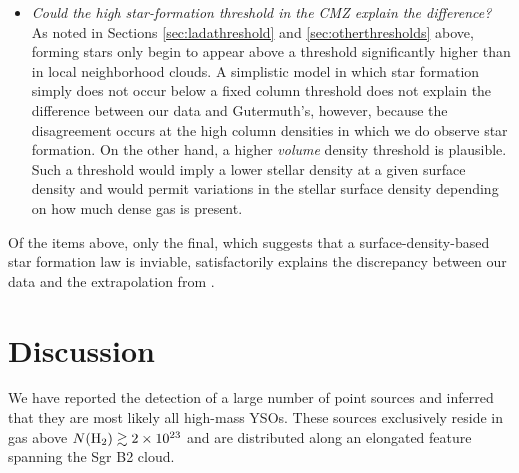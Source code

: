 \documentclass[twocolumn]{aastex61}
\begin{document}
\begin{itemize}
    \item \emph{Could the high star-formation threshold in the CMZ explain the
        difference?}
        As noted in Sections \ref{sec:ladathreshold} and
        \ref{sec:otherthresholds} above, forming stars only begin to appear
        above a threshold significantly higher than in local neighborhood
        clouds.  A simplistic model in which star formation simply does not
        occur below a fixed column threshold does not explain the difference
        between our data and Gutermuth's, however, because the disagreement
        occurs at the high column densities in which we do observe star
        formation.  On the other hand, a higher \emph{volume} density threshold
        is plausible.  Such a threshold would imply a lower stellar density at
        a given surface density and would  permit variations in the stellar
        surface density depending on how much dense gas is present.



\end{itemize}

Of the items above, only the final, which suggests that a surface-density-based
star formation law is inviable, satisfactorily explains the discrepancy between
our data and the extrapolation from \citet{Gutermuth2011a}.




\section{Discussion}
\label{sec:discussion}
We have reported the detection of a large number of point sources and inferred
that they are most likely all high-mass YSOs.  These sources exclusively
reside in gas above $N(\textrm{H}_{2})\gtrsim2\times10^{23}$ \persc and are distributed along an
elongated  feature spanning the Sgr B2 cloud.
\end{document}
